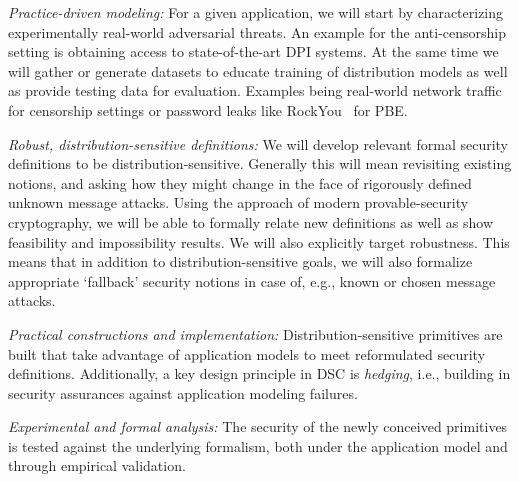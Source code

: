 \begin{newenum}

\item{\em Practice-driven modeling:} For a given application, we will start by 
characterizing experimentally real-world adversarial threats. An example for the
anti-censorship setting is obtaining access to state-of-the-art DPI systems.
At the same time we will gather or generate datasets to educate training of 
distribution models as well as provide testing data for evaluation. 
Examples being real-world network traffic for censorship settings 
or password leaks like RockYou~\cite{} for PBE. 

\item{\em Robust, distribution-sensitive definitions:} 
We will develop relevant formal security definitions to be
distribution-sensitive. Generally this will mean revisiting existing notions,
and asking how they might change in the face of rigorously defined unknown
message attacks. Using the approach of modern 
provable-security cryptography, we will be able to formally relate new
definitions as well as show feasibility and impossibility results. 
We will also explicitly target robustness. This means that
in addition to distribution-sensitive goals, we will also formalize
appropriate `fallback' security notions in case of, e.g., known or chosen message
attacks.

\item{\em Practical constructions and implementation:}  
Distribution-sensitive primitives are built that take
advantage of application models to meet reformulated security definitions.
Additionally, a key design principle in DSC is {\em hedging}, i.e., building in
security assurances against application modeling failures. 

\item{\em Experimental and formal analysis:} 
The security of the newly conceived primitives is tested
against the underlying formalism, both under the application model and through
empirical validation.

\end{newenum}



